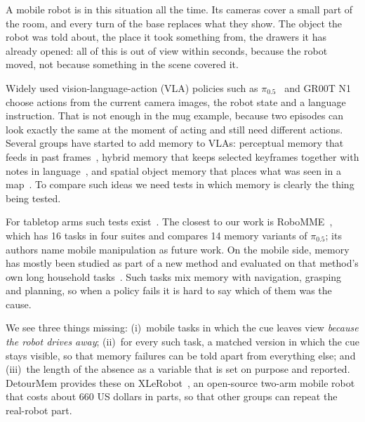 \documentclass[conference]{IEEEtran}
\newcommand{\pizf}{$\pi_{0.5}$}
\begin{document}
A mobile robot is in this situation all the time. Its cameras cover a small part of the room, and every turn of the base replaces what they show. The object the robot was told about, the place it took something from, the drawers it has already opened: all of this is out of view within seconds, because the robot moved, not because something in the scene covered it.

Widely used vision-language-action (VLA) policies such as \pizf{}~\cite{black2025pi05} and GR00T N1~\cite{bjorck2025gr00t} choose actions from the current camera images, the robot state and a language instruction. That is not enough in the mug example, because two episodes can look exactly the same at the moment of acting and still need different actions. Several groups have started to add memory to VLAs: perceptual memory that feeds in past frames~\cite{dai2026robomme}, hybrid memory that keeps selected keyframes together with notes in language~\cite{sridhar2026memer,torne2026mem}, and spatial object memory that places what was seen in a map~\cite{li2026soma,lin2025echovla,banwasi2026messymem,liu2024dynamem}. To compare such ideas we need tests in which memory is clearly the thing being tested.

For tabletop arms such tests exist~\cite{dai2026robomme,cherepanov2026mikasa,fang2025sam2act,chung2026libero,chen2026rmbench,lei2026robomemarena}. The closest to our work is RoboMME~\cite{dai2026robomme}, which has 16 tasks in four suites and compares 14 memory variants of \pizf{}; its authors name mobile manipulation as future work. On the mobile side, memory has mostly been studied as part of a new method and evaluated on that method's own long household tasks~\cite{lin2025echovla,banwasi2026messymem,qian2026escape}. Such tasks mix memory with navigation, grasping and planning, so when a policy fails it is hard to say which of them was the cause.

We see three things missing: (i)~mobile tasks in which the cue leaves view \emph{because the robot drives away}; (ii)~for every such task, a matched version in which the cue stays visible, so that memory failures can be told apart from everything else; and (iii)~the length of the absence as a variable that is set on purpose and reported. DetourMem provides these on XLeRobot~\cite{wang2025xlerobot}, an open-source two-arm mobile robot that costs about 660 US dollars in parts, so that other groups can repeat the real-robot part.
\end{document}
